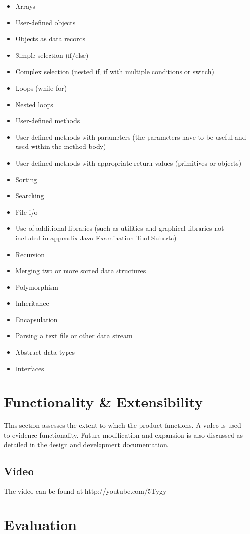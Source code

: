\documentclass{tufte-book}
\begin{document}
\small
\begin{itemize}
\item Arrays
\item User-defined objects
\item Objects as data records
\item Simple selection (if/else)
\item Complex selection (nested if, if with multiple conditions or switch)
\item Loops (while for)
\item Nested loops
\item User-defined methods
\item User-defined methods with parameters (the parameters have to be useful and used within the method body)
\item User-defined methods with appropriate return values (primitives or objects)
\item Sorting
\item Searching
\item File i/o
\item Use of additional libraries (such as utilities and graphical libraries not included in appendix Java Examination Tool Subsets)
\item Recursion
\item Merging two or more sorted data structures
\item Polymorphism
\item Inheritance
\item Encapsulation
\item Parsing a text file or other data stream
\item Abstract data types
\item Interfaces
\end{itemize}


\chapter{Functionality \& Extensibility}
This section assesses the extent to which the product functions.  A video is used to evidence functionality.  Future modification and expansion is also discussed as detailed in the design and development documentation.

\section{Video}
The video can be found at http://youtube.com/5Tygy

\chapter{Evaluation}
\end{document}

